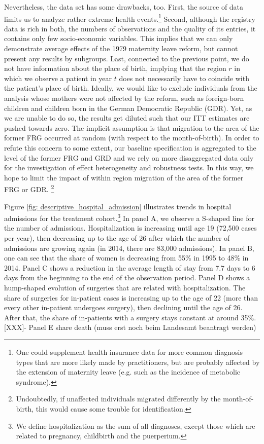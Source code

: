 \documentclass[11pt, a4paper]{article} %
\begin{document}
Nevertheless, the data set has some drawbacks, too. First, the source of data limits us to analyze rather extreme health events.\footnote{One could supplement health insurance data for more common diagnosis types that are more likely made by practitioners, but are probably affected by the extension of maternity leave (e.g. such as the incidence of metabolic syndrome).} Second, although the registry data is rich in both, the numbers of observations and the quality of its entries, it contains only few socio-economic variables. This implies that we can only demonstrate average effects of the 1979 maternity leave reform, but cannot present any results by subgroups. Last, connected to the previous point, we do not have information about the place of birth, implying that the region $r$ in which we observe a patient in year $t$ does not necessarily have to coincide with the patient's place of birth. Ideally, we would like to exclude individuals from the analysis whose mothers were not affected by the reform, such as foreign-born children and children born in the German Democratic Republic (GDR). Yet, as we are unable to do so, the results get diluted such that our ITT estimates are pushed towards zero. The implicit assumption is that migration to the area of the former FRG occurred at random (with respect to the month-of-birth). In order to refute this concern to some extent, our baseline specification is aggregated to the level of the former FRG and GRD and we rely on more disaggregated data only for the investigation of effect heterogeneity and robustness tests. In this way, we hope to limit the impact of within region migration of the area of the former FRG or GDR. \footnote{Undoubtedly, if unaffected individuals migrated differently by the month-of-birth, this would cause some trouble for identification.}\newline


Figure \ref{fig: descriptive_hospital_admission} illustrates trends in hospital admissions for the treatment cohort.\footnote{We define hospitalization as the sum of all diagnoses, except those which are related to pregnancy, childbirth and the puerperium.} In panel A, we observe a S-shaped line for the number of admissions. Hospitalization is increasing until age 19 (72,500 cases per year), then decreasing up to the age of 26 after which the number of admissions are growing again (in 2014, there are 83,000 admissions). In panel B, one can see that the share of women is decreasing from 55\% in 1995 to 48\% in 2014. Panel C shows a reduction in the average length of stay from 7.7 days to 6 days from the beginning to the end of the observation period. Panel D shows a hump-shaped evolution of surgeries that are related with hospitalization. The share of surgeries for in-patient cases is increasing up to the age of 22 (more than every other in-patient undergoes surgery), then declining until the age of 26. After that, the share of in-patients with a surgery stays constant at around 35\%.
[XXX]- Panel E share death (muss erst noch beim Landesamt beantragt werden)\newline
\end{document}
